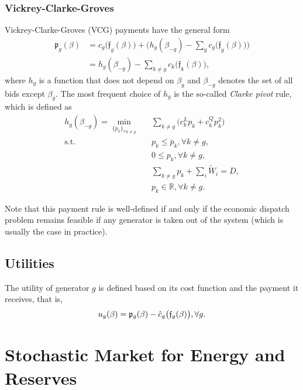 \documentclass{article}
\begin{document}
\subsubsection{Vickrey-Clarke-Groves}

Vickrey-Clarke-Groves (VCG) payments have the general form
\begin{align*}
\mathfrak{p}_g(\beta) &= c_g\big(\mathfrak{f}_g(\beta)\big) + \Big(h_g(\beta_{-g}) - \sum_{g} c_g\big(\mathfrak{f}_g(\beta)\big) \Big)\\
&= h_g(\beta_{-g}) - \sum_{k \ne g} c_k\big(\mathfrak{f}_k(\beta)\big),
\end{align*}
where $h_g$ is a function that does not depend on $\beta_g$ and $\beta_{-g}$ denotes the set of all bids except $\beta_g$. The most frequent choice of $h_g$ is the so-called \textit{Clarke pivot} rule, which is defined as
\begin{align}
h_g(\beta_{-g}) = \underset{\{p_k\}_{\forall k \ne g}}{\min} \hspace{10pt} & \sum_{k \ne g} \Big(c_k^Lp_k + c_k^Q p_k^2 \Big)\\
\mbox{s.t. } & p_k \le \overline{p}_k,\forall k \ne g,\\
& 0 \le p_k,\forall k \ne g,\\
& \sum_{k \ne g} p_k + \sum_i \tilde{W}_i = D,\\
& p_k \in \mathbb{R}, \forall k \ne g.
\end{align}

Note that this payment rule is well-defined if and only if the economic dispatch problem remains feasible if any generator is taken out of the system (which is usually the case in practice).

\subsection{Utilities}

The utility of generator $g$ is defined based on its cost function and the payment it receives, that is,
\begin{equation}
u_g(\beta) = \mathfrak{p}_g(\beta) - \hat{c}_g\big(\frak{f}_g(\beta)\big), \forall g.
\end{equation}

\section{Stochastic Market for Energy and Reserves}

\end{document}
